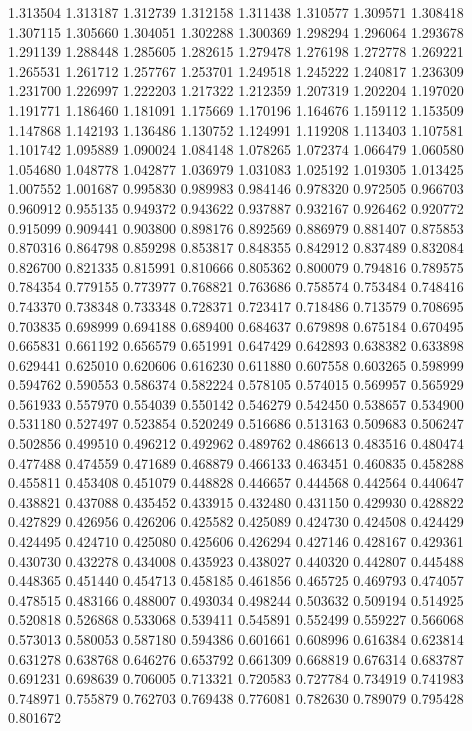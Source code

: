 1.313504
1.313187
1.312739
1.312158
1.311438
1.310577
1.309571
1.308418
1.307115
1.305660
1.304051
1.302288
1.300369
1.298294
1.296064
1.293678
1.291139
1.288448
1.285605
1.282615
1.279478
1.276198
1.272778
1.269221
1.265531
1.261712
1.257767
1.253701
1.249518
1.245222
1.240817
1.236309
1.231700
1.226997
1.222203
1.217322
1.212359
1.207319
1.202204
1.197020
1.191771
1.186460
1.181091
1.175669
1.170196
1.164676
1.159112
1.153509
1.147868
1.142193
1.136486
1.130752
1.124991
1.119208
1.113403
1.107581
1.101742
1.095889
1.090024
1.084148
1.078265
1.072374
1.066479
1.060580
1.054680
1.048778
1.042877
1.036979
1.031083
1.025192
1.019305
1.013425
1.007552
1.001687
0.995830
0.989983
0.984146
0.978320
0.972505
0.966703
0.960912
0.955135
0.949372
0.943622
0.937887
0.932167
0.926462
0.920772
0.915099
0.909441
0.903800
0.898176
0.892569
0.886979
0.881407
0.875853
0.870316
0.864798
0.859298
0.853817
0.848355
0.842912
0.837489
0.832084
0.826700
0.821335
0.815991
0.810666
0.805362
0.800079
0.794816
0.789575
0.784354
0.779155
0.773977
0.768821
0.763686
0.758574
0.753484
0.748416
0.743370
0.738348
0.733348
0.728371
0.723417
0.718486
0.713579
0.708695
0.703835
0.698999
0.694188
0.689400
0.684637
0.679898
0.675184
0.670495
0.665831
0.661192
0.656579
0.651991
0.647429
0.642893
0.638382
0.633898
0.629441
0.625010
0.620606
0.616230
0.611880
0.607558
0.603265
0.598999
0.594762
0.590553
0.586374
0.582224
0.578105
0.574015
0.569957
0.565929
0.561933
0.557970
0.554039
0.550142
0.546279
0.542450
0.538657
0.534900
0.531180
0.527497
0.523854
0.520249
0.516686
0.513163
0.509683
0.506247
0.502856
0.499510
0.496212
0.492962
0.489762
0.486613
0.483516
0.480474
0.477488
0.474559
0.471689
0.468879
0.466133
0.463451
0.460835
0.458288
0.455811
0.453408
0.451079
0.448828
0.446657
0.444568
0.442564
0.440647
0.438821
0.437088
0.435452
0.433915
0.432480
0.431150
0.429930
0.428822
0.427829
0.426956
0.426206
0.425582
0.425089
0.424730
0.424508
0.424429
0.424495
0.424710
0.425080
0.425606
0.426294
0.427146
0.428167
0.429361
0.430730
0.432278
0.434008
0.435923
0.438027
0.440320
0.442807
0.445488
0.448365
0.451440
0.454713
0.458185
0.461856
0.465725
0.469793
0.474057
0.478515
0.483166
0.488007
0.493034
0.498244
0.503632
0.509194
0.514925
0.520818
0.526868
0.533068
0.539411
0.545891
0.552499
0.559227
0.566068
0.573013
0.580053
0.587180
0.594386
0.601661
0.608996
0.616384
0.623814
0.631278
0.638768
0.646276
0.653792
0.661309
0.668819
0.676314
0.683787
0.691231
0.698639
0.706005
0.713321
0.720583
0.727784
0.734919
0.741983
0.748971
0.755879
0.762703
0.769438
0.776081
0.782630
0.789079
0.795428
0.801672
